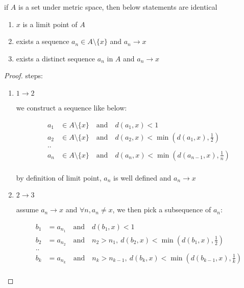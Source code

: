 \begin{exercise}
    if $A$ is a set under metric space, then below statements are identical

    \begin{enumerate}
        \item $x$ is a limit point of $A$

        \item exists a sequence $a_n \in A \setminus \{ x \}$ and $a_n \to x$

        \item exists a distinct sequence $a_n$ in $A$ and $a_n \to x$

    \end{enumerate}
\end{exercise}

\begin{proof}
    steps:

    \begin{enumerate}
        \item $1 \to 2$

        we construct a sequence like below:

        \begin{align*}
            a_1 & \in A \setminus \{x\} \quad \text {and} \quad d(a_1, x) < 1 \\
            a_2 & \in A \setminus \{x\} \quad \text {and} \quad d(a_2, x) < \min(d(a_1, x), \frac{1}{2}) \\
            .. \\
            a_n & \in A \setminus \{x\} \quad \text {and} \quad d(a_n, x) < \min(d(a_{n-1}, x), \frac{1}{n}) \\
        \end{align*}

        by definition of limit point, $a_n$ is well defined and $a_n \to x$

        \item $2 \to 3$

        assume $a_n \to x$ and $\forall n, a_n \ne x$, we then pick a subsequence of $a_n$:

        \begin{align*}
            b_1 &= a_{n_1} \quad \text{and} \quad d(b_1, x) < 1 \\
            b_2 &= a_{n_2} \quad \text{and} \quad n_2 > n_1,\: d(b_2, x) < \min(d(b_1, x), \frac{1}{2}) \\
            .. \\
            b_k &= a_{n_k} \quad \text{and} \quad n_k > n_{k-1},\: d(b_k, x) < \min(d(b_{k-1}, x), \frac{1}{k}) \\
        \end{align*}


\end{enumerate}
\end{proof}
